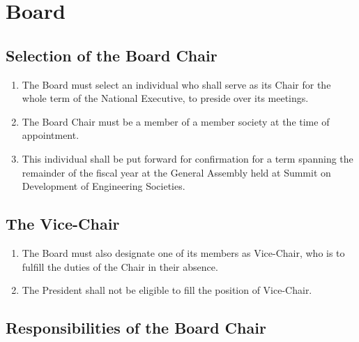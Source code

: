 \section{Board}
\label{board}

\subsection{Selection of the Board Chair}
\label{selection-of-the-board-chair}

\begin{enumerate}
 \item
  The Board must select an individual who shall serve as its Chair for the whole term of the National Executive, to preside over its meetings.
 \item
  The Board Chair must be a member of a member society at the time of appointment.
 \item
  This individual shall be put forward for confirmation for a term spanning the remainder of the fiscal year at the General Assembly held at Summit on Development of Engineering Societies.
\end{enumerate}

\subsection{The Vice-Chair}
\label{the-vice-chair}

\begin{enumerate}
 \item
  The Board must also designate one of its members as Vice-Chair, who is to fulfill the duties of the Chair in their absence.
 \item
  The President shall not be eligible to fill the position of Vice-Chair.
\end{enumerate}

\subsection{Responsibilities of the Board Chair}
\label{responsibilities-of-the-board-chair}

